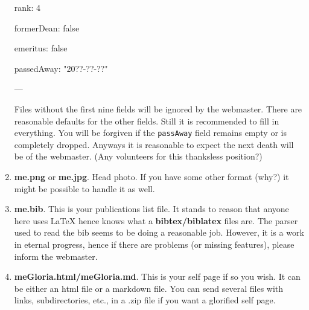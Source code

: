\documentclass{article}
\begin{document}
\begin{enumerate}
\begin{tt}
\textvisiblespace \textvisiblespace \textvisiblespace rank: 4

\textvisiblespace \textvisiblespace \textvisiblespace formerDean: false

\textvisiblespace \textvisiblespace \textvisiblespace emeritus: false

\textvisiblespace \textvisiblespace \textvisiblespace passedAway: "20??-??-??"

---

	\end{tt}
Files without the first nine fields will be ignored by the webmaster.
There are reasonable defaults for the other fields.
Still it is recommended to fill in everything.
You will be forgiven if the {\tt passAway} field remains empty or is completely dropped.
Anyways it is reasonable to expect the next death will be of the webmaster.
(Any volunteers for this thanksless position?)

\item
	{\bf me.png} or {\bf me.jpg}. Head photo. 
	If you have some other format (why?) it might be possible to handle it as well.

\item
  {\bf \textunderscore me.bib}.
	This is your publications list file.
	It stands to reason that anyone here uses {\LaTeX}  hence knows what a {\bf bibtex/biblatex} files are.
   The parser used to read the bib seems to be doing a reasonable job.
	However, it is a work in eternal progress, hence if there are problems (or missing features),
		please inform the webmaster.

\item
	{\bf meGloria.html/meGloria.md}.
		This is your self page if so you wish.
	It can be either an html file or a markdown file.
	You can send several files with links, subdirectories, etc., in a .zip file if you want a glorified
	self page.
\end{enumerate}
\end{document}
